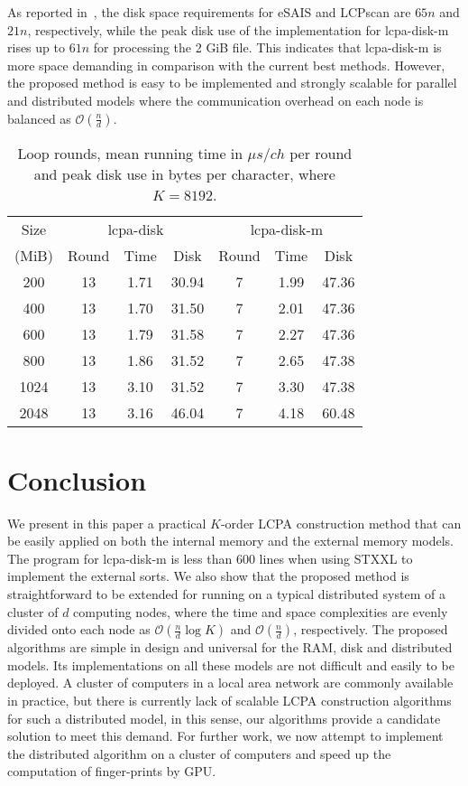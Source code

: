 \documentclass[article]{IEEEtran}
\theoremstyle{definition}
\theoremstyle{remark}
\numberwithin{equation}{section}
\begin{document}
As reported in~\cite{Juha2014}, the disk space requirements for eSAIS and LCPscan are $65n$ and $21n$, respectively, while the peak disk use of the implementation for lcpa-disk-m rises up to $61n$ for processing the 2 GiB file. This indicates that {lcpa-disk-m} is more space demanding in comparison with the current best methods. However, the proposed method is easy to be implemented and strongly scalable for parallel and distributed models where the communication overhead on each node is balanced as $\mathcal{O}(\frac{n}{d})$.


\begin{table}
\caption{Loop rounds, mean running time in $\mu s/ch$ per round and peak disk use in bytes per character, where $K=8192$.}
\label{tbl:exp:result}
\centering
\begin{tabular}{|c|c|c|c|c|c|c|}
\hline
Size & \multicolumn{3}{c|}{lcpa-disk} & \multicolumn{3}{c|}{lcpa-disk-m} \\
\cline{2-7}
(MiB) & Round &  Time &  Disk & Round & Time &  Disk \\
\hline
200 & 13 & 1.71 & 30.94 & 7 & 1.99 & 47.36\\
\hline
400 & 13 & 1.70 & 31.50  & 7 & 2.01 & 47.36\\
\hline
600 & 13 & 1.79 & 31.58 & 7 & 2.27 & 47.36\\
\hline
800 & 13 & 1.86 & 31.52 & 7 & 2.65 & 47.38\\
\hline
1024 & 13 & 3.10 & 31.52 & 7 & 3.30 & 47.38\\
\hline
2048 & 13 & 3.16 & 46.04 & 7 & 4.18 & 60.48\\
\hline
\end{tabular}
\centering
\end{table}

\section{Conclusion}\label{sec:conclusion}

We present in this paper a practical $K$-order LCPA construction method that can be easily applied on both the internal memory and the external memory models. The program for lcpa-disk-m is less than 600 lines when using STXXL to implement the external sorts. We also show that the proposed method is straightforward to be extended for running on a typical distributed system of a cluster of $d$ computing nodes, where the time and space complexities are evenly divided onto each node as $\mathcal{O}(\frac{n}{d}\log K)$ and $\mathcal{O}(\frac{n}{d})$, respectively. The proposed algorithms are simple in design and universal for the RAM, disk and distributed models. Its implementations on all these models are not difficult and easily to be deployed.
A cluster of computers in a local area network are commonly available in practice, but there is currently lack of scalable LCPA construction algorithms for such a distributed model, in this sense, our algorithms provide a candidate solution to meet this demand. For further work, we now attempt to implement the distributed algorithm on a cluster of computers and speed up the computation of finger-prints by GPU.


\end{document}
